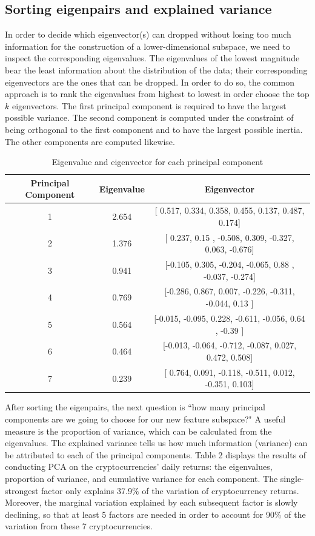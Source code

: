 \documentclass[12pt,twoside]{article}
\newcommand{\head}[1]{\textnormal{\textbf{#1}}}
\begin{document}
\subsection{Sorting eigenpairs and explained variance}
\bigbreak
In order to decide which eigenvector(s) can dropped without losing too much information for the construction of a lower-dimensional subspace, we need to inspect the corresponding eigenvalues. The eigenvalues of the lowest magnitude bear the least information about the distribution of the data; their corresponding eigenvectors are the ones that can be dropped. In order to do so, the common approach is to rank the eigenvalues from highest to lowest in order choose the top $k$ eigenvectors. The first principal component is required to have the largest possible variance. The second component is computed under the constraint of being orthogonal to the first component and to have the largest possible inertia. The other components are computed likewise.
\bigbreak
\begin{table}[H]
\begin{tabular}{ccc}
\hline
\head{Principal Component} & \head{Eigenvalue} & \head{Eigenvector}\\
\hline
1  & 2.654 & [ 0.517,  0.334,  0.358,  0.455,  0.137,  0.487,  0.174]\\
2 & 1.376 &  [ 0.237,  0.15 , -0.508,  0.309, -0.327,  0.063, -0.676]\\
3 & 0.941 & [-0.105,  0.305, -0.204, -0.065,  0.88 , -0.037, -0.274]\\
4 & 0.769 & [-0.286,  0.867,  0.007, -0.226, -0.311, -0.044,  0.13 ]\\
5 & 0.564 & [-0.015, -0.095,  0.228, -0.611, -0.056,  0.64 , -0.39 ]\\
6 & 0.464 & [-0.013, -0.064, -0.712, -0.087,  0.027,  0.472,  0.508]\\
7 & 0.239 & [ 0.764,  0.091, -0.118, -0.511,  0.012, -0.351,  0.103]\\
\hline
\end{tabular}
\caption{Eigenvalue and eigenvector for each principal component}
\end{table}
\bigbreak
After sorting the eigenpairs, the next question is ``how many principal components are we going to choose for our new feature subspace?" A useful measure is the proportion of variance, which can be calculated from the eigenvalues. The explained variance tells us how much information (variance) can be attributed to each of the principal components.
\bigbreak
Table 2 displays the results of conducting PCA on the cryptocurrencies' daily returns: the eigenvalues, proportion of variance, and cumulative variance for each component. The single-strongest factor only explains 37.9$\%$ of the variation of cryptocurrency returns. Moreover, the marginal variation explained by each subsequent factor is slowly declining, so that at least 5 factors are needed in order to account for 90$\%$ of the variation from these 7 cryptocurrencies.
\end{document}
